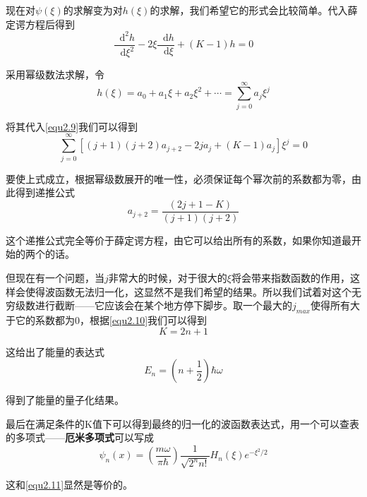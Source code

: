 \documentclass[UTF8]{ctexart}
\newcommand*{\dif}{\mathop{}\!\mathrm{d}}
\begin{document}
    现在对$\psi(\xi)$的求解变为对$h(\xi)$的求解，我们希望它的形式会比较简单。代入薛定谔方程后得到
    \begin{equation}
        \frac{\dif^2 h}{\dif \xi^2} - 2 \xi \frac{\dif h}{\dif \xi} +(K-1)h = 0\label{equ2.9}
    \end{equation}

\noindent 采用幂级数法求解，令
\begin{equation}
    h(\xi) = a_0 +a_1 \xi + a_2 \xi^2 + \cdots = \sum_{j=0}^{\infty}a_j \xi^j
\end{equation}

\noindent 将其代入\autoref{equ2.9}我们可以得到
\begin{equation}
    \sum_{j=0}^{\infty}\left[(j+1)(j+2) a_{j+2}-2 j a_{j}+(K-1) a_{j}\right] \xi^{j}=0
\end{equation}

    要使上式成立，根据幂级数展开的唯一性，必须保证每个幂次前的系数都为零，由此得到递推公式
    \begin{equation}
        a_{j+2} = \frac{(2j+1-K)}{(j+1)(j+2)}\label{equ2.10}
    \end{equation}

\noindent 这个递推公式完全等价于薛定谔方程，由它可以给出所有的系数，如果你知道最开始的两个的话。

    但现在有一个问题，当$j$非常大的时候，对于很大的$\xi$将会带来指数函数的作用，这样会使得波函数无法归一化，这显然不是我们希望的结果。所以我们试着对这个无穷级数进行截断——它应该会在某个地方停下脚步。取一个最大的$j_{max}$使得所有大于它的系数都为0，根据\autoref{equ2.10}我们可以得到
    \begin{equation}
        K =2n + 1
    \end{equation}

\noindent 这给出了能量的表达式
\begin{equation}
    E_n = \left(n+\frac{1}{2}\right)\hbar \omega 
\end{equation}

\noindent 得到了能量的量子化结果。

    最后在满足条件的K值下可以得到最终的归一化的波函数表达式，用一个可以查表的多项式——\textbf{厄米多项式}可以写成
    \begin{equation}
        \psi_n(x) = \left(\frac{m\omega}{\pi \hbar}\right)\frac{1}{\sqrt{2^n n!}}H_n(\xi)e^{-\xi^2/2}
    \end{equation}

\noindent 这和\autoref{equ2.11}显然是等价的。
\end{document}
